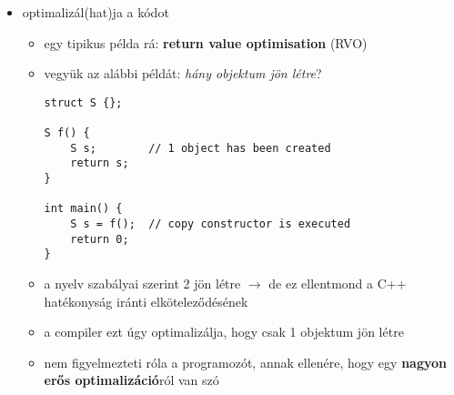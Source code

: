 \documentclass[a4paper, 11pt, oneside]{book}
\begin{document}
\begin{enumerate}[label=\Roman{*}.)]
\begin{itemize}
\begin{itemize}
\begin{itemize}
				\item \textbf{számliterálok}: \verb*|123|, \verb*|12.34|, \verb*|0x123|, \verb*|42UL|, stb.
				\item \textbf{operátorok}: \verb*|<<|, \verb*|+|, stb.
				\begin{itemize}
					\item \underline{precedencia}: melyik részkifejezés értékelődik ki hamarabb
					\item \underline{asszociativitás}: balra- vagy jobbra köt
					\item \underline{aritás}: operandusainak száma (unáris, bináris, ternáris)
					\item \underline{fixitás}: prefix, infix, postfix
					\item \underline{típus}: pl. az osztás másképp működik \verb*|int| és \verb*|double| esetében
					\item \underline{mellékhatás, eredmény}: C/C++-ban meghatározzák az operátort
				\end{itemize}
			
			
				\item \textbf{szeparátorok}: \verb*|';'|, \verb*|','|, \verb|'\t'|, \verb*|' '|\footnote{Ez a szóközt hivatott szemléletesebben ábrázolni.} (\textit{whitespace} karakterek)
			\end{itemize}
			\item ebből felépíti a program \textbf{absztrakt szintaxisfá}ját a kifejezésekből
			\item ezután következik a \textit{szemantikai elemzés} ($\Leftrightarrow$ van-e értelme annak, amit leírtunk?)
		\end{itemize}
		
		\item optimalizál(hat)ja a kódot
		
		\begin{itemize}
			\item egy tipikus példa rá: \textbf{return value optimisation} (RVO)
			\item vegyük az alábbi példát: \textit{hány objektum jön létre}?
\begin{lstlisting}[style=cppstyle]
struct S {};

S f() { 
	S s; 		// 1 object has been created
	return s; 
}

int main() {
	S s = f();	// copy constructor is executed
	return 0;
}
\end{lstlisting}
			\item a nyelv szabályai szerint 2 jön létre $\to$ de ez ellentmond a C++ hatékonyság iránti elköteleződésének
			\item a compiler ezt úgy optimalizálja, hogy csak 1 objektum jön létre
			\item nem figyelmezteti róla a programozót, annak ellenére, hogy egy \textbf{nagyon erős optimalizáció}ról van szó
		\end{itemize}
		

\end{itemize}
\end{enumerate}
\end{document}
